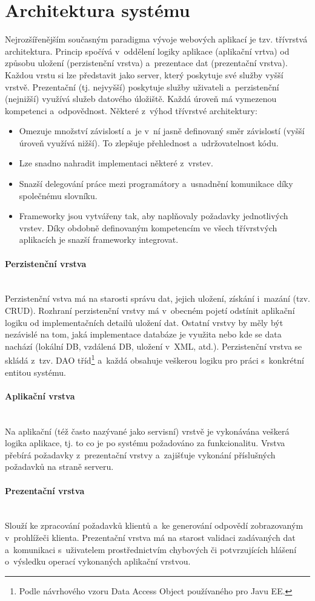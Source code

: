 \documentclass[11pt, draft, oneside]{fithesis2}
\newcommand{\paragraphNewLine}[1]{\paragraph*{#1}\mbox{}\\}
\begin{document}
\section{Architektura systému}
Nejrozšířenějším současným paradigma vývoje webových aplikací je tzv. třívrstvá architektura. Princip spočívá v~oddělení logiky aplikace (aplikační vrtva) od způsobu uložení (perzistenční vrstva) a~prezentace dat (prezentační vrstva). Každou vrstu si lze představit jako server, který poskytuje své služby vyšší vrstvě. Prezentační (tj. nejvyšší) poskytuje služby uživateli a~perzistenční (nejnižší) využívá služeb datového úložiště. Každá úroveň má vymezenou kompetenci a~odpovědnost.
Některé z~výhod třívrstvé architektury:
\begin{itemize}
	\item Omezuje množství závislostí a~je v~ní jasně definovaný směr závislostí (vyšší úroveň využívá nižší). To zlepšuje přehlednost a~udržovatelnost kódu.
	\item Lze snadno nahradit implementaci některé z~vrstev.
	\item Snazší delegování práce mezi programátory a~usnadnění komunikace díky společnému slovníku.
	\item Frameworky jsou vytvářeny tak, aby naplňovaly požadavky jednotlivých vrstev. Díky obdobně definovaným kompetencím ve všech třívrstvých aplikacích je snazší frameworky integrovat.
\end{itemize}

\paragraphNewLine{Perzistenční vrstva}
Perzistenční vstva má na starosti správu dat, jejich uložení, získání i~mazání (tzv. CRUD). Rozhraní perzistenční vrstvy má v~obecném pojetí odstínit aplikační logiku od implementačních detailů uložení dat. Ostatní vrstvy by měly být nezávislé na tom, jaká implementace databáze je využita nebo kde se data nachází (lokální DB, vzdálená DB, uložení v~XML, atd.).
Perzistenční vrstva se skládá z~tzv. DAO tříd\footnote{Podle návrhového vzoru Data Access Object používaného pro Javu EE.} a~každá obsahuje veškerou logiku pro práci s~konkrétní entitou systému.

\paragraphNewLine{Aplikační vrstva} 
Na aplikační (též často nazývané jako servisní) vrstvě je vykonávána veškerá logika aplikace, tj. to co je po systému požadováno za funkcionalitu. Vrstva přebírá požadavky z~prezentační vrstvy a~zajišťuje vykonání příslušných požadavků na straně serveru. 

\paragraphNewLine{Prezentační vrstva} 
Slouží ke zpracování požadavků klientů a~ke generování odpovědí zobrazovaným v~prohlížeči klienta. Prezentační vrstva má na starost validaci zadávaných dat a~komunikaci s~uživatelem prostřednictvím chybových či potvrzujících hlášení o~výsledku operací vykonaných aplikační vrstvou. 
\end{document}

